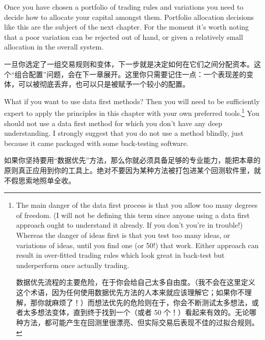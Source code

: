 \bipairgap

\begin{englishblock} Once you have chosen a portfolio of trading rules and variations you need to decide how to allocate your capital amongst them. Portfolio allocation decisions like this are the subject of the next chapter. For the moment it's worth noting that a poor variation can be rejected out of hand, or given a relatively small allocation in the overall system. \end{englishblock}

\begin{chineseblock}一旦你选定了一组交易规则和变体，下一步就是决定如何在它们之间分配资本。这个“组合配置”问题，会在下一章展开。这里你只需要记住一点：一个表现差的变体，可以被彻底丢弃，也可以只是被赋予一个较小的配置。\end{chineseblock}

\bipairgap

\begin{englishblock} What if you want to use data first methods? Then you will need to be sufficiently expert to apply the principles in this chapter with your own preferred tools.\footnote{The main danger of the data first process is that you allow too many degrees of freedom. (I will not be defining this term since anyone using a data first approach ought to understand it already. If you don't you're in trouble!) Whereas the danger of ideas first is that you test too many ideas, or variations of ideas, until you find one (or 50!) that work. Either approach can result in over-fitted trading rules which look great in back-test but underperform once actually trading. \par 数据优先流程的主要危险，在于你会给自己太多自由度。（我不会在这里定义这个术语，因为任何使用数据优先方法的人本来就应该理解它；如果你不理解，那你就麻烦了！）而想法优先的危险则在于，你会不断测试太多想法，或者太多想法变体，直到终于找到一个（或者 50 个！）看起来有效的。无论哪种方法，都可能产生在回测里很漂亮、但实际交易后表现不佳的过拟合规则。} You should not use a data first method for which you don't have any deep understanding. I strongly suggest that you do not use a method blindly, just because it came packaged with some back-testing software. \end{englishblock}

\begin{chineseblock}如果你坚持要用“数据优先”方法，那么你就必须具备足够的专业能力，能把本章的原则真正应用到你的工具上。绝对不要因为某种方法被打包进某个回测软件里，就不假思索地照单全收。\end{chineseblock}

